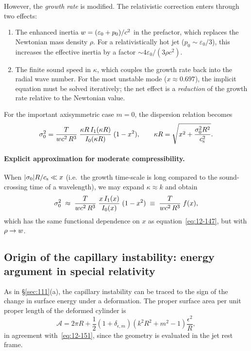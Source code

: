 However, the \emph{growth rate} is modified.  The relativistic
correction enters through two effects:
\begin{enumerate}
\item The enhanced inertia $w = (\varepsilon_{0}+p_{0})/c^{2}$
  in the prefactor, which replaces the Newtonian mass density $\rho$.
  For a relativistically hot jet ($p_{0} \sim \varepsilon_{0}/3$),
  this increases the effective inertia by a factor
  $\sim 4\varepsilon_{0}/(3\rho c^{2})$.
\item The finite sound speed in $\kappa$, which couples the growth
  rate back into the radial wave number.  For the most unstable
  mode ($x \approx 0.697$), the implicit equation must be solved
  iteratively; the net effect is a \emph{reduction} of the growth
  rate relative to the Newtonian value.
\end{enumerate}

For the important axisymmetric case $m = 0$, the dispersion relation
becomes
\begin{equation}
\label{eq:rel-111-disp-m0}
\sigma_{0}^{2} = \frac{T}{w c^{2}\,R^{3}}\;
  \frac{\kappa R\,I_{1}(\kappa R)}{I_{0}(\kappa R)}\;
  (1 - x^{2}),
\qquad
\kappa R = \sqrt{x^{2} + \frac{\sigma_{0}^{2}R^{2}}{c_{\mathrm{s}}^{2}}}.
\end{equation}

\paragraph{Explicit approximation for moderate compressibility.}
When $|\sigma_{0}|R/c_{\mathrm{s}} \ll x$ (i.e.\ the growth time-scale is
long compared to the sound-crossing time of a wavelength), we may
expand $\kappa \approx k$ and obtain
\begin{equation}
\label{eq:rel-111-approx}
\sigma_{0}^{2} \;\approx\;
  \frac{T}{w c^{2}\,R^{3}}\;
  \frac{x\,I_{1}(x)}{I_{0}(x)}\;(1-x^{2})
  \;\equiv\;
  \frac{T}{w c^{2}\,R^{3}}\;f(x),
\end{equation}
which has the same functional dependence on $x$ as
equation~\eqref{eq:12-147}, but with $\rho \to w$.

\subsection{Origin of the capillary instability:
energy argument in special relativity}
\label{sec:rel-111-origin}

As in \S\ref{sec:111}(a), the capillary instability can be traced to
the sign of the change in surface energy under a deformation.
The proper surface area per unit proper length of the deformed
cylinder is
\begin{equation}
\label{eq:rel-111-area}
\mathcal{A} = 2\pi R
  + \frac{1}{2}(1+\delta_{\epsilon,m})
  (k^{2}R^{2}+m^{2}-1)\frac{\epsilon^{2}}{R},
\end{equation}
in agreement with~\eqref{eq:12-151}, since the geometry is
evaluated in the jet rest frame.

